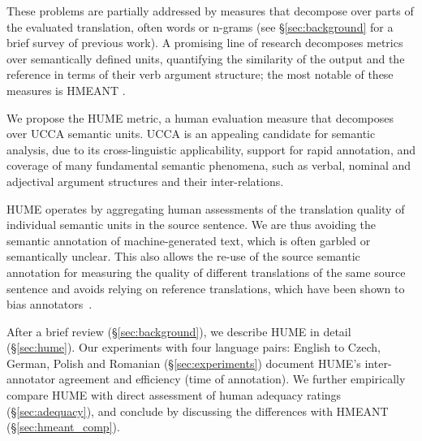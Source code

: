 \documentclass[11pt,letterpaper]{article}
\newcommand{\secref}[1]{\S\ref{#1}}
\newcommand{\XXX}[1]{{\color{red}XXX #1}} %
\def\parcite#1{\cite{#1}}
\begin{document}
These problems are partially addressed by measures that decompose over parts of the evaluated
translation, often words or n-grams (see \secref{sec:background} for a brief survey of previous
work). A promising line of research decomposes metrics
over semantically defined units, quantifying the similarity of the output and the
reference in terms of their verb argument structure; the most notable of these measures is HMEANT
\parcite{lo2011structured}.



We propose the HUME metric,
a human evaluation measure that decomposes over UCCA semantic units.
UCCA \parcite{abend2013universal} is an appealing candidate for semantic analysis,
due to its cross-linguistic applicability, support for rapid annotation, and coverage
of many fundamental semantic phenomena, such as verbal, nominal and adjectival
argument structures and their inter-relations.

HUME operates by aggregating human assessments of the translation quality of individual
semantic units in the source sentence. We 
are thus avoiding the semantic annotation of machine-generated text,
which is often garbled or semantically unclear.
This also allows the re-use of the source semantic annotation for
measuring the quality of different translations of the same source sentence
and avoids relying on reference translations, 
which have been shown to bias annotators~\cite{fomicheva-specia_ACL:2016}.


After a brief review (\secref{sec:background}), we describe HUME in detail
(\secref{sec:hume}). 
Our experiments with four language pairs: English to Czech, German, Polish and Romanian (\secref{sec:experiments}) document HUME's inter-annotator agreement and efficiency (time of annotation). We further empirically compare HUME with direct assessment of human adequacy ratings (\secref{sec:adequacy}), and conclude by discussing the differences with HMEANT (\secref{sec:hmeant_comp}).
\end{document}
